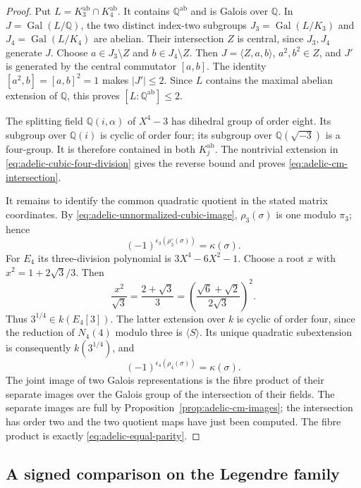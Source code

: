 \begin{proof}
Put $L=K_3^{\mathrm{ab}}\cap K_4^{\mathrm{ab}}$.
It contains $\mathbb Q^{\mathrm{ab}}$ and is Galois over
$\mathbb Q$.  In $J=\operatorname{Gal}(L/\mathbb Q)$, the two
distinct index-two subgroups
$J_3=\operatorname{Gal}(L/K_3)$ and
$J_4=\operatorname{Gal}(L/K_4)$ are abelian.
Their intersection $Z$ is central, since $J_3,J_4$ generate $J$.
Choose $a\in J_3\setminus Z$ and $b\in J_4\setminus Z$.
Then $J=\langle Z,a,b\rangle$, $a^2,b^2\in Z$, and
$J'$ is generated by the central commutator $[a,b]$.
The identity $[a^2,b]=[a,b]^2=1$ makes $|J'|\leq2$.
Since $L$ contains the maximal abelian extension of $\mathbb Q$,
this proves $[L:\mathbb Q^{\mathrm{ab}}]\leq2$.

The splitting field $\mathbb Q(i,\alpha)$ of $X^4-3$ has dihedral
group of order eight.  Its subgroup over $\mathbb Q(i)$ is cyclic
of order four; its subgroup over $\mathbb Q(\sqrt{-3})$ is a
four-group.  It is therefore contained in both $K_j^{\mathrm{ab}}$.
The nontrivial extension in
\eqref{eq:adelic-cubic-four-division} gives the reverse bound and
proves \eqref{eq:adelic-cm-intersection}.

It remains to identify the common quadratic quotient in the stated
matrix coordinates.  By
\eqref{eq:adelic-unnormalized-cubic-image},
$\rho_3(\sigma)$ is one modulo $\pi_3$; hence
\[
 (-1)^{\epsilon_3(\rho_3^{\circ}(\sigma))}
                      =\kappa(\sigma).
\]
For $E_4$ its three-division polynomial is
$3X^4-6X^2-1$.  Choose a root $x$ with
$x^2=1+2\sqrt3/3$.  Then
\[
 \frac{x^2}{\sqrt3}=\frac{2+\sqrt3}{3}
     =\left(\frac{\sqrt6+\sqrt2}{2\sqrt3}\right)^2.
\]
Thus $3^{1/4}\in k(E_4[3])$.  The latter extension over $k$ is
cyclic of order four, since the reduction of $N_4(4)$ modulo
three is $\langle S\rangle$.  Its unique quadratic subextension
is consequently $k(3^{1/4})$, and
\[
 (-1)^{\epsilon_4(\rho_4(\sigma))}=\kappa(\sigma).
\]
The joint image of two Galois representations is the fibre product
of their separate images over the Galois group of the intersection
of their fields.  The separate images are full by
Proposition~\ref{prop:adelic-cm-images}; the intersection has order
two and the two quotient maps have just been computed.  The fibre
product is exactly \eqref{eq:adelic-equal-parity}.
\end{proof}

\subsection{A signed comparison on the Legendre family}

